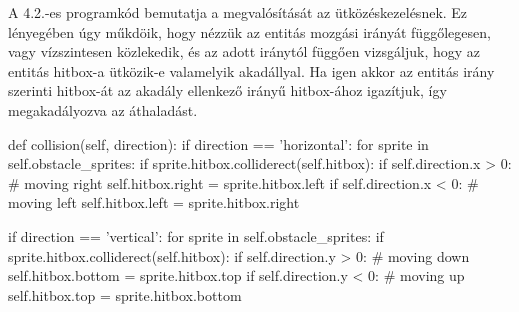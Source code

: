 A 4.2.-es programkód bemutatja a megvalósítását az ütközéskezelésnek. Ez lényegében úgy műkdöik, hogy nézzük az entitás mozgási irányát függőlegesen, vagy vízszintesen közlekedik, és az adott iránytól függően vizsgáljuk, hogy az entitás hitbox-a ütközik-e valamelyik akadállyal. Ha igen akkor az entitás irány szerinti hitbox-át az akadály ellenkező irányű hitbox-ához igazítjuk, így megakadályozva az áthaladást. 
\begin{python}[caption={Ütközés kezelés},label=py:Ütközés kezelés]
    def collision(self, direction):
    if direction == 'horizontal':
    for sprite in self.obstacle_sprites:
    if sprite.hitbox.colliderect(self.hitbox):
    if self.direction.x > 0:
    # moving right
    self.hitbox.right = sprite.hitbox.left
    if self.direction.x < 0:
                        # moving left
                        self.hitbox.left = sprite.hitbox.right
                        
                        if direction == 'vertical':
                        for sprite in self.obstacle_sprites:
                        if sprite.hitbox.colliderect(self.hitbox):
                    if self.direction.y > 0:
                        # moving down
                        self.hitbox.bottom = sprite.hitbox.top
                        if self.direction.y < 0:
                        # moving up
                        self.hitbox.top = sprite.hitbox.bottom
                    \end{python}

                    
